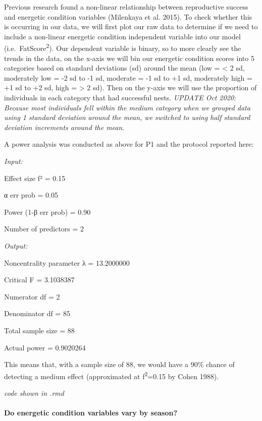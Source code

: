 \documentclass[
]{article}
\begin{document}
Previous research found a non-linear relationship between reproductive
success and energetic condition variables (Milenkaya et al. 2015). To
check whether this is occurring in our data, we will first plot our raw
data to determine if we need to include a non-linear energetic condition
independent variable into our model (i.e.~FatScore\textsuperscript{2}).
Our dependent variable is binary, so to more clearly see the trends in
the data, on the x-axis we will bin our energetic condition scores into
5 categories based on standard deviations (sd) around the mean (low =
\textless{} 2 sd, moderately low = -2 sd to -1 sd, moderate = -1 sd to
+1 sd, moderately high = +1 sd to +2 sd, high = \textgreater{} 2 sd).
Then on the y-axis we will use the proportion of individuals in each
category that had successful nests. \emph{UPDATE Oct 2020: Because most
individuals fell within the medium category when we grouped data using 1
standard deviation around the mean, we switched to using half standard
deviation increments around the mean.}

A power analysis was conducted as above for P1 and the protocol reported
here:

\emph{Input:}

Effect size f² = 0.15

α err prob = 0.05

Power (1-β err prob) = 0.90

Number of predictors = 2

\emph{Output:}

Noncentrality parameter λ = 13.2000000

Critical F = 3.1038387

Numerator df = 2

Denominator df = 85

Total sample size = 88

Actual power = 0.9020264

This means that, with a sample size of 88, we would have a 90\% chance
of detecting a medium effect (approximated at f\textsuperscript{2}=0.15
by Cohen 1988).

\emph{code shown in .rmd}

\hypertarget{do-energetic-condition-variables-vary-by-season}{%
\paragraph{Do energetic condition variables vary by
season?}\label{do-energetic-condition-variables-vary-by-season}}
\end{document}
